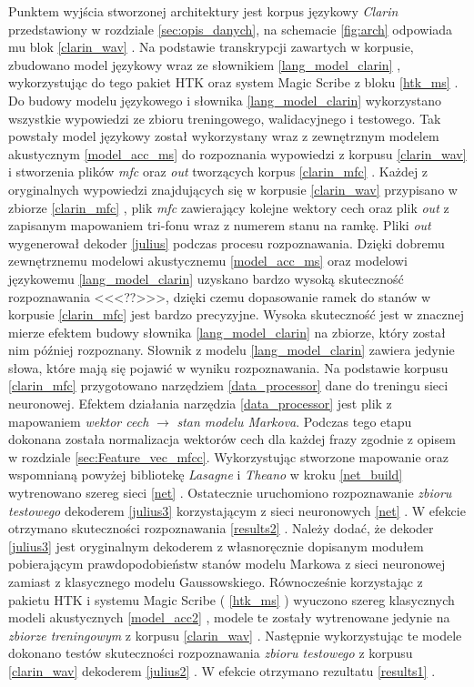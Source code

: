 \documentclass[11pt]{article}
\newcommand{\refBlock}[1]{%
	\hyperref[#1]{\ref*{#1}}%
}
\begin{document}
	Punktem wyjścia stworzonej architektury jest korpus językowy \textit{Clarin} przedstawiony w rozdziale \ref{sec:opis_danych}, na schemacie \ref{fig:arch} odpowiada mu blok \refBlock{clarin_wav}. Na podstawie transkrypcji zawartych w korpusie, zbudowano model językowy wraz ze słownikiem \refBlock{lang_model_clarin}, wykorzystując do tego pakiet HTK oraz system Magic Scribe z bloku \refBlock{htk_ms}. Do budowy modelu językowego i słownika \refBlock{lang_model_clarin} wykorzystano wszystkie wypowiedzi ze zbioru treningowego, walidacyjnego i testowego. Tak powstały model językowy został wykorzystany wraz z zewnętrznym modelem akustycznym \refBlock{model_acc_ms} do rozpoznania wypowiedzi z korpusu \refBlock{clarin_wav} i stworzenia plików \textit{mfc} oraz \textit{out} tworzących korpus \refBlock{clarin_mfc}. Każdej z oryginalnych wypowiedzi znajdujących się w korpusie \refBlock{clarin_wav} przypisano w zbiorze \refBlock{clarin_mfc}, plik \textit{mfc} zawierający kolejne wektory cech oraz plik \textit{out} z zapisanym mapowaniem tri-fonu wraz z numerem stanu na ramkę. Pliki \textit{out} wygenerował dekoder \refBlock{julius} podczas procesu rozpoznawania. Dzięki dobremu zewnętrznemu  modelowi akustycznemu \refBlock{model_acc_ms} oraz modelowi językowemu \refBlock{lang_model_clarin} uzyskano bardzo wysoką skuteczność rozpoznawania <<<??>>>, dzięki czemu dopasowanie ramek do stanów w korpusie \refBlock{clarin_mfc} jest bardzo precyzyjne. Wysoka skuteczność jest w znacznej mierze efektem budowy słownika \refBlock{lang_model_clarin} na zbiorze, który został nim później rozpoznany. Słownik z modelu \refBlock{lang_model_clarin} zawiera jedynie słowa, które mają się pojawić w wyniku rozpoznawania. Na podstawie korpusu \refBlock{clarin_mfc} przygotowano narzędziem \refBlock{data_processor} dane do treningu sieci neuronowej. Efektem działania narzędzia \refBlock{data_processor} jest plik z mapowaniem \textit{wektor cech} $\longrightarrow$ \textit{stan modelu Markova}. Podczas tego etapu dokonana została normalizacja wektorów cech dla każdej frazy zgodnie z opisem w rozdziale \ref{sec:Feature_vec_mfcc}. Wykorzystując stworzone mapowanie oraz wspomnianą powyżej bibliotekę \textit{Lasagne} i \textit{Theano} w kroku \refBlock{net_build} wytrenowano szereg sieci \refBlock{net}. Ostatecznie uruchomiono rozpoznawanie \textit{zbioru testowego} dekoderem \refBlock{julius3} korzystającym z sieci neuronowych \refBlock{net}. W efekcie otrzymano skuteczności rozpoznawania \refBlock{results2}. Należy dodać, że dekoder \refBlock{julius3} jest oryginalnym dekoderem z własnoręcznie dopisanym modułem pobierającym prawdopodobieństw stanów modelu Markowa z sieci neuronowej zamiast z klasycznego modelu Gaussowskiego. Równocześnie korzystając z pakietu HTK i systemu Magic Scribe (\refBlock{htk_ms}) wyuczono szereg klasycznych modeli akustycznych \refBlock{model_acc2}, modele te zostały wytrenowane jedynie na \textit{zbiorze treningowym} z korpusu \refBlock{clarin_wav}. Następnie wykorzystując te modele dokonano testów skuteczności rozpoznawania \textit{zbioru testowego} z korpusu \refBlock{clarin_wav} dekoderem \refBlock{julius2}. W efekcie otrzymano rezultatu \refBlock{results1}.
	
\end{document}
